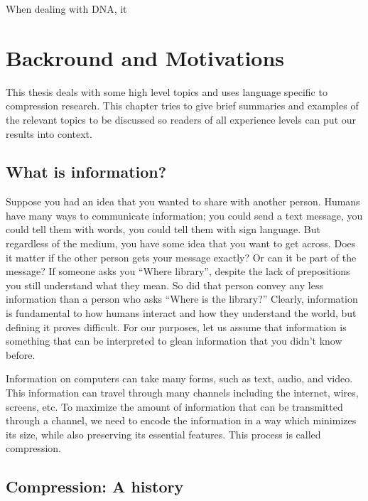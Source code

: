\documentclass[12pt,twoside]{reedthesis}
\begin{document}
When dealing with DNA, it

\hypertarget{backround-and-motivations}{%
\chapter{Backround and Motivations}\label{backround-and-motivations}}

This thesis deals with some high level topics and uses language specific to compression research. This chapter tries to give brief summaries and examples of the relevant topics to be discussed so readers of all experience levels can put our results into context.

\hypertarget{what-is-information}{%
\section{What is information?}\label{what-is-information}}

Suppose you had an idea that you wanted to share with another person. Humans have many ways to communicate information; you could send a text message, you could tell them with words, you could tell them with sign language. But regardless of the medium, you have some idea that you want to get across. Does it matter if the other person gets your message exactly? Or can it be part of the message? If someone asks you ``Where library'', despite the lack of prepositions you still understand what they mean. So did that person convey any less information than a person who asks ``Where is the library?''
Clearly, information is fundamental to how humans interact and how they understand the world, but defining it proves difficult. For our purposes, let us assume that information is something that can be interpreted to glean information that you didn't know before.

Information on computers can take many forms, such as text, audio, and video. This information can travel through many channels including the internet, wires, screens, etc. To maximize the amount of information that can be transmitted through a channel, we need to encode the information in a way which minimizes its size, while also preserving its essential features. This process is called compression.

\hypertarget{compression-a-history}{%
\section{Compression: A history}\label{compression-a-history}}
\end{document}
